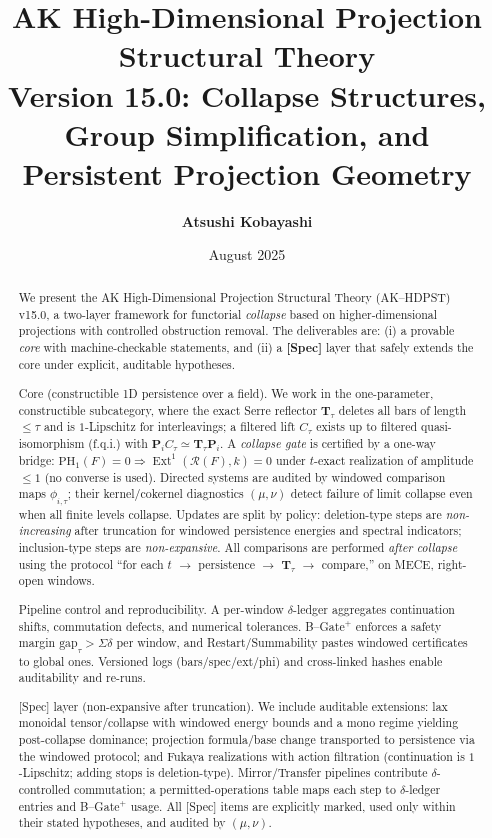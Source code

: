 \documentclass[11pt]{article}
\title{AK High-Dimensional Projection Structural Theory\\
\Large Version 15.0: Collapse Structures, Group Simplification, and Persistent Projection Geometry}
\author{\textbf{Atsushi Kobayashi} \quad {\small (with ChatGPT Research Partner)}}
\date{August 2025}
\DeclareMathOperator{\Ext}{Ext}
\numberwithin{equation}{section}
\theoremstyle{definition}
\begin{document}
\maketitle



\begin{abstract}
We present the AK High-Dimensional Projection Structural Theory (AK--HDPST) v15.0, a two-layer framework for functorial \emph{collapse} based on higher-dimensional projections with controlled obstruction removal. The deliverables are:
(i) a provable \emph{core} with machine-checkable statements, and
(ii) a \textbf{[Spec]} layer that safely extends the core under explicit, auditable hypotheses.

Core (constructible 1D persistence over a field).
We work in the one-parameter, constructible subcategory, where the exact Serre reflector \(\mathbf{T}_\tau\) deletes all bars of length \(\le \tau\) and is \(1\)-Lipschitz for interleavings; a filtered lift \(C_\tau\) exists up to filtered quasi-isomorphism (f.q.i.) with \(\mathbf{P}_i C_\tau \simeq \mathbf{T}_\tau \mathbf{P}_i\).
A \emph{collapse gate} is certified by a one-way bridge:
\(\mathrm{PH}_1(F)=0 \Rightarrow \Ext^1(\mathcal{R}(F),k)=0\) under \(t\)-exact realization of amplitude \(\le 1\) (no converse is used).
Directed systems are audited by windowed comparison maps \(\phi_{i,\tau}\); their kernel/cokernel diagnostics \((\mu,\nu)\) detect failure of limit collapse even when all finite levels collapse.
Updates are split by policy: deletion-type steps are \emph{non-increasing} after truncation for windowed persistence energies and spectral indicators; inclusion-type steps are \emph{non-expansive}.
All comparisons are performed \emph{after collapse} using the protocol
“for each \(t\) \(\to\) persistence \(\to\) \(\mathbf{T}_\tau\) \(\to\) compare,”
on MECE, right-open windows.

Pipeline control and reproducibility.
A per-window \(\delta\)-ledger aggregates continuation shifts, commutation defects, and numerical tolerances.
B--Gate\(^{+}\) enforces a safety margin \(\mathrm{gap}_\tau>\Sigma\delta\) per window, and Restart/Summability pastes windowed certificates to global ones.
Versioned logs (bars/spec/ext/phi) and cross-linked hashes enable auditability and re-runs.

[Spec] layer (non-expansive after truncation).
We include auditable extensions:
lax monoidal tensor/collapse with windowed energy bounds and a mono regime yielding post-collapse dominance;
projection formula/base change transported to persistence via the windowed protocol;
and Fukaya realizations with action filtration (continuation is \(1\)-Lipschitz; adding stops is deletion-type).
Mirror/Transfer pipelines contribute \(\delta\)-controlled commutation; a permitted-operations table maps each step to \(\delta\)-ledger entries and B--Gate\(^{+}\) usage.
All [Spec] items are explicitly marked, used only within their stated hypotheses, and audited by \((\mu,\nu)\).


\end{abstract}
\end{document}
